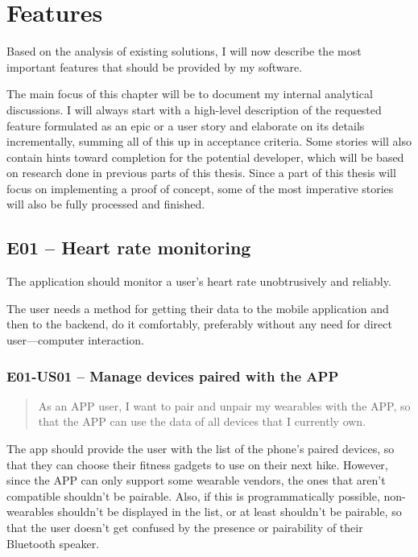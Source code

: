 \section{Features}
Based on the analysis of existing solutions, I will now describe the most important features that should be provided by my software.

The main focus of this chapter will be to document my internal analytical discussions.
I will always start with a high-level description of the requested feature formulated as an epic or a user story and elaborate on its details incrementally, summing all of this up in acceptance criteria.
Some stories will also contain hints toward completion for the potential developer, which will be based on research done in previous parts of this thesis.
Since a part of this thesis will focus on implementing a proof of concept, some of the most imperative stories will also be fully processed and finished.

\subsection*{E01 -- Heart rate monitoring}
The application should monitor a user's heart rate unobtrusively and reliably.

The user needs a method for getting their data to the mobile application and then to the backend, do it comfortably, preferably without any need for direct user---computer interaction.

\subsubsection*{E01-US01 -- Manage devices paired with the APP}
\begin{quote}
As an APP user, I want to pair and unpair my wearables with the APP, so that the APP can use the data of all devices that I currently own.
\end{quote}
The app should provide the user with the list of the phone's paired devices, so that they can choose their fitness gadgets to use on their next hike.
However, since the APP can only support some wearable vendors, the ones that aren't compatible shouldn't be pairable.
Also, if this is programmatically possible, non-wearables shouldn't be displayed in the list, or at least shouldn't be pairable,
so that the user doesn't get confused by the presence or pairability of their Bluetooth speaker.

